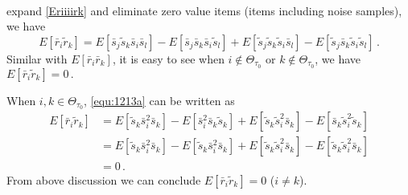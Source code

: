 \begin{equation}
\begin{split}
\end{split}
\label{Eriiiirk}
\end{equation}
expand \eqref{Eriiiirk} and eliminate zero value items (items including noise samples), we have 
 \begin{equation}
   E[\bar{r}_i\tilde{r}_k] = E[\bar{s}_j\tilde{s}_k\bar{s}_i\bar{s}_l] -  E[\bar{s}_j\bar{s}_k\bar{s}_i\tilde{s}_l] + E[\tilde{s}_j\tilde{s}_k\tilde{s}_i\bar{s}_l] - E[\tilde{s}_j\bar{s}_k\tilde{s}_i\tilde{s}_l]\,.
   \label{equ:1213a}
\end{equation}
Similar with $E[\bar{r}_i\bar{r}_k]$, it is easy to see when  $i \notin \Theta_{\tau_0} $ or $k \notin \Theta_{\tau_0} $, we have 
$
E[\bar{r}_i\tilde{r}_k] = 0\,.
$

When $i,k \in \Theta_{\tau_0}$, \eqref{equ:1213a} can be written as
 \begin{equation}
   \begin{split}
   E[\bar{r}_i\tilde{r}_k] &= E[\tilde{s}_k\bar{s}_i^2\bar{s}_k] -  E[\bar{s}_i^2\bar{s}_k\tilde{s}_k] + E[\tilde{s}_k\tilde{s}_i^2\bar{s}_k] - E[\bar{s}_k\tilde{s}_i^2\tilde{s}_k]\\
   &= E[\tilde{s}_k\bar{s}_i^2\bar{s}_k] -  E[\tilde{s}_k\bar{s}_i^2\bar{s}_k] + E[\tilde{s}_k\tilde{s}_i^2\bar{s}_k] - E[\tilde{s}_k\tilde{s}_i^2\bar{s}_k]\\
   &= 0\,. 
 \end{split}
   \label{equ:1213b}
\end{equation}
From above discussion we can conclude $E[\bar{r}_i\tilde{r}_k] = 0$ ($i \neq k $).  

